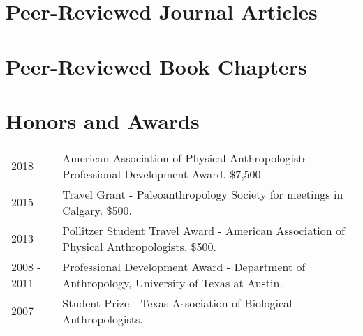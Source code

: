 \documentclass{article}
\begin{document}
\pagebreak

\section*{Peer-Reviewed Journal Articles}

\begin{etaremune}

\end{etaremune}


\section*{Peer-Reviewed Book Chapters}
\begin{etaremune}

\end{etaremune}

\section*{Honors and Awards}

\begin{tabular}{p{}p{}}
2018 & American Association of Physical Anthropologists - Professional Development Award. \$7,500\\[4pt]
2015 & Travel Grant - Paleoanthropology Society for meetings in Calgary. \$500.\\[4pt]
2013 & Pollitzer Student Travel Award - American Association of Physical Anthropologists. \$500.\\[4pt]
2008 - 2011 & Professional Development Award - Department of Anthropology, University of Texas at Austin.\\[4pt]
2007 & Student Prize - Texas Association of Biological Anthropologists.\\
\end{tabular}
\end{document}
